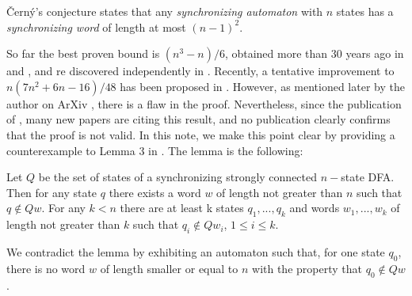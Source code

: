 \documentclass{llncs}
\begin{document}
\v Cern{\'y}'s conjecture \cite{Cerny64} states that any \emph{synchronizing automaton} with $n$ states has a \emph{synchronizing word} of length at most $(n-1)^2$.

So far the best proven bound is $(n^3-n)/6$, obtained more than 30 years ago in \cite{Frankl82} and \cite{Pin83a}, and re discovered independently in \cite{KlyachkoRystsovSpivak87}. Recently, a tentative improvement to $n(7n^2+6n-16)/48$ has been proposed in  \cite{Trahtman2011}. However, as mentioned later by the author on ArXiv \cite{ArxivPTraht}, there is a flaw in the proof. Nevertheless, since the publication of \cite{Trahtman2011}, many new papers are citing this result, and no publication clearly confirms that the proof is not valid. In this note, we make this point clear by providing a counterexample to Lemma 3 in \cite{Trahtman2011}. The lemma is the following:

\begin{lemma}
\label{FalseLemma}
Let $Q$ be the set of states of a synchronizing strongly connected $n-$state DFA. Then for any state $q$ there exists a word $w$ of length not greater than $n$ such that $q \notin Q w$. For any $k<n$ there are at least k states $q_1, ..., q_k$ and words $w_1, ..., w_k$ of length not greater than $k$ such that $q_i\notin Q w_i$, $1\leq i\leq k$.
\end{lemma}

We contradict the lemma by exhibiting an automaton such that, for one state $q_0$, there is no word $w$ of length smaller or equal to $n$ with the property that $q_0 \notin Q w$.
\end{document}
